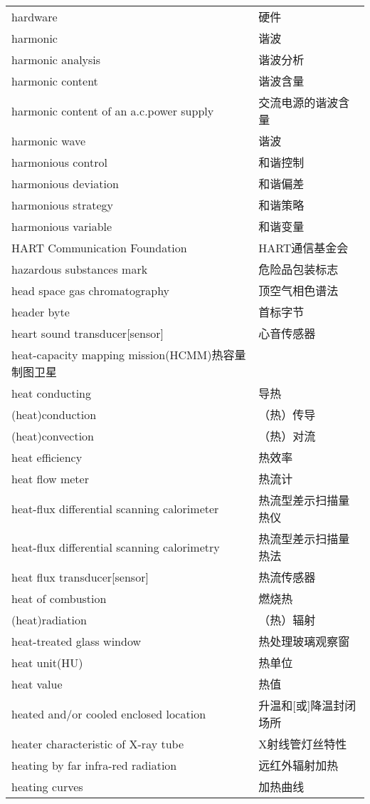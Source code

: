 \documentclass[
]{article}
\begin{document}
\begin{longtable}[]{@{}ll@{}}
hardware & 硬件 \\
harmonic & 谐波 \\
harmonic analysis & 谐波分析 \\
harmonic content & 谐波含量 \\
harmonic content of an a.c.power supply & 交流电源的谐波含量 \\
harmonic wave & 谐波 \\
harmonious control & 和谐控制 \\
harmonious deviation & 和谐偏差 \\
harmonious strategy & 和谐策略 \\
harmonious variable & 和谐变量 \\
HART Communication Foundation & HART通信基金会 \\
hazardous substances mark & 危险品包装标志 \\
head space gas chromatography & 顶空气相色谱法 \\
header byte & 首标字节 \\
heart sound transducer{[}sensor{]} & 心音传感器 \\
heat-capacity mapping mission(HCMM)热容量制图卫星 & \\
heat conducting & 导热 \\
(heat)conduction & （热）传导 \\
(heat)convection & （热）对流 \\
heat efficiency & 热效率 \\
heat flow meter & 热流计 \\
heat-flux differential scanning calorimeter & 热流型差示扫描量热仪 \\
heat-flux differential scanning calorimetry & 热流型差示扫描量热法 \\
heat flux transducer{[}sensor{]} & 热流传感器 \\
heat of combustion & 燃烧热 \\
(heat)radiation & （热）辐射 \\
heat-treated glass window & 热处理玻璃观察窗 \\
heat unit(HU) & 热单位 \\
heat value & 热值 \\
heated and/or cooled enclosed location & 升温和{[}或{]}降温封闭场所 \\
heater characteristic of X-ray tube & X射线管灯丝特性 \\
heating by far infra-red radiation & 远红外辐射加热 \\
heating curves & 加热曲线 \\

\end{longtable}
\end{document}
